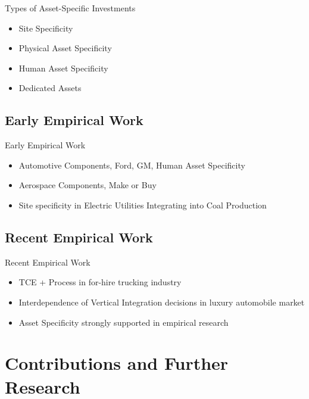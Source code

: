 \documentclass{beamer}
\begin{document}
\begin{frame}{Types of Asset-Specific Investments}
\begin{itemize}
\item<1->{Site Specificity}
\item<2->{Physical Asset Specificity}
\item<3->{Human Asset Specificity}
\item<4->{Dedicated Assets}
\end{itemize}
\cite{Williamson1983}
\end{frame}

\subsection{Early Empirical Work}
\begin{frame}{Early Empirical Work}
\begin{itemize}
\item<1->{\citep{Monteverde1982} Automotive Components, Ford, GM, Human Asset Specificity}
\item<2->{\citep{Masten1984} Aerospace Components, Make or Buy}
\item<3->{\citep{Joskow1985} Site specificity in Electric Utilities Integrating into Coal Production}
\end{itemize}
\end{frame}

\subsection{Recent Empirical Work}
\begin{frame}{Recent Empirical Work}
\begin{itemize}
\item<1->{\citep{Nickerson2003} TCE + Process in for-hire trucking industry}
\item<2->{\citep{Novak2009} Interdependence of Vertical Integration decisions in luxury automobile market}
\item<3->{\citep{David2004} Asset Specificity strongly supported in empirical research}
\end{itemize}
\end{frame}

\section{Contributions and Further Research}
\end{document}
